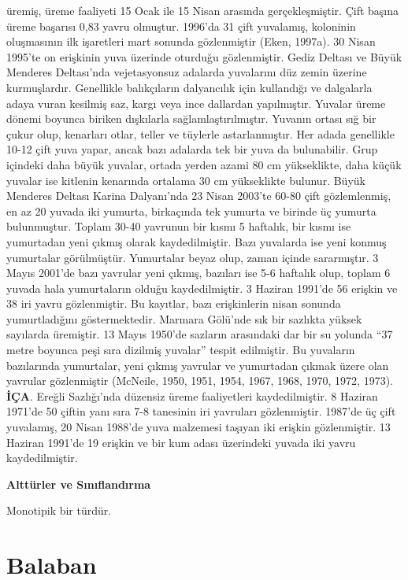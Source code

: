 \documentclass[
  a4paper,
  DIV=11,
  numbers=noendperiod]{scrreprt}
\begin{document}
üremiş, üreme faaliyeti 15 Ocak ile 15 Nisan arasında gerçekleşmiştir.
Çift başına üreme başarısı 0,83 yavru olmuştur. 1996'da 31 çift
yuvalamış, koloninin oluşmasının ilk işaretleri mart sonunda
gözlenmiştir (Eken, 1997a). 30 Nisan 1995'te on erişkinin yuva üzerinde
oturduğu gözlenmiştir. Gediz Deltası ve Büyük Menderes Deltası'nda
vejetasyonsuz adalarda yuvalarını düz zemin üzerine kurmuşlardır.
Genellikle balıkçıların dalyancılık için kullandığı ve dalgalarla adaya
vuran kesilmiş saz, kargı veya ince dallardan yapılmıştır. Yuvalar üreme
dönemi boyunca biriken dışkılarla sağlamlaştırılmıştır. Yuvanın ortası
sığ bir çukur olup, kenarları otlar, teller ve tüylerle astarlanmıştır.
Her adada genellikle 10-12 çift yuva yapar, ancak bazı adalarda tek bir
yuva da bulunabilir. Grup içindeki daha büyük yuvalar, ortada yerden
azami 80 cm yükseklikte, daha küçük yuvalar ise kitlenin kenarında
ortalama 30 cm yükseklikte bulunur. Büyük Menderes Deltası Karina
Dalyanı'nda 23 Nisan 2003'te 60-80 çift gözlemlenmiş, en az 20 yuvada
iki yumurta, birkaçında tek yumurta ve birinde üç yumurta bulunmuştur.
Toplam 30-40 yavrunun bir kısmı 5 haftalık, bir kısmı ise yumurtadan
yeni çıkmış olarak kaydedilmiştir. Bazı yuvalarda ise yeni konmuş
yumurtalar görülmüştür. Yumurtalar beyaz olup, zaman içinde sararmıştır.
3 Mayıs 2001'de bazı yavrular yeni çıkmış, bazıları ise 5-6 haftalık
olup, toplam 6 yuvada hala yumurtaların olduğu kaydedilmiştir. 3 Haziran
1991'de 56 erişkin ve 38 iri yavru gözlenmiştir. Bu kayıtlar, bazı
erişkinlerin nisan sonunda yumurtladığını göstermektedir. Marmara
Gölü'nde sık bir sazlıkta yüksek sayılarda üremiştir. 13 Mayıs 1950'de
sazların arasındaki dar bir su yolunda ``37 metre boyunca peşi sıra
dizilmiş yuvalar'' tespit edilmiştir. Bu yuvaların bazılarında
yumurtalar, yeni çıkmış yavrular ve yumurtadan çıkmak üzere olan
yavrular gözlenmiştir (McNeile, 1950, 1951, 1954, 1967, 1968, 1970,
1972, 1973). \textbf{İÇA}. Ereğli Sazlığı'nda düzensiz üreme
faaliyetleri kaydedilmiştir. 8 Haziran 1971'de 50 çiftin yanı sıra 7-8
tanesinin iri yavruları gözlenmiştir. 1987'de üç çift yuvalamış, 20
Nisan 1988'de yuva malzemesi taşıyan iki erişkin gözlenmiştir. 13
Haziran 1991'de 19 erişkin ve bir kum adası üzerindeki yuvada iki yavru
kaydedilmiştir.

\textbf{Alttürler ve Sınıflandırma}

Monotipik bir türdür.

\section{Balaban}\label{balaban}
\end{document}
